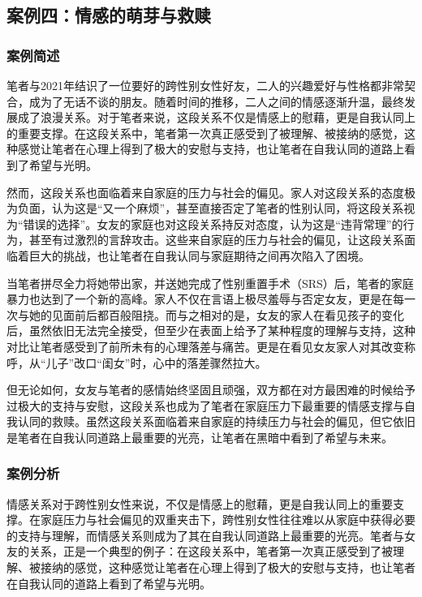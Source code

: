 \documentclass[twocolumn]{ctexart}
\begin{document}
\subsection {案例四：情感的萌芽与救赎}
\subsubsection{案例简述}
笔者与2021年结识了一位要好的跨性别女性好友，二人的兴趣爱好与性格都非常契合，成为了无话不谈的朋友。随着时间的推移，二人之间的情感逐渐升温，最终发展成了浪漫关系。对于笔者来说，这段关系不仅是情感上的慰藉，更是自我认同上的重要支撑。在这段关系中，笔者第一次真正感受到了被理解、被接纳的感觉，这种感觉让笔者在心理上得到了极大的安慰与支持，也让笔者在自我认同的道路上看到了希望与光明。

然而，这段关系也面临着来自家庭的压力与社会的偏见。家人对这段关系的态度极为负面，认为这是“又一个麻烦”，甚至直接否定了笔者的性别认同，将这段关系视为“错误的选择”。女友的家庭也对这段关系持反对态度，认为这是“违背常理”的行为，甚至有过激烈的言辞攻击。这些来自家庭的压力与社会的偏见，让这段关系面临着巨大的挑战，也让笔者在自我认同与家庭期待之间再次陷入了困境。

当笔者拼尽全力将她带出家，并送她完成了性别重置手术（SRS）后，笔者的家庭暴力也达到了一个新的高峰。家人不仅在言语上极尽羞辱与否定女友，更是在每一次与她的见面前后都百般阻挠。而与之相对的是，女友的家人在看见孩子的变化后，虽然依旧无法完全接受，但至少在表面上给予了某种程度的理解与支持，这种对比让笔者感受到了前所未有的心理落差与痛苦。更是在看见女友家人对其改变称呼，从“儿子”改口“闺女”时，心中的落差骤然拉大。

但无论如何，女友与笔者的感情始终坚固且顽强，双方都在对方最困难的时候给予过极大的支持与安慰，这段关系也成为了笔者在家庭压力下最重要的情感支撑与自我认同的救赎。虽然这段关系面临着来自家庭的持续压力与社会的偏见，但它依旧是笔者在自我认同道路上最重要的光亮，让笔者在黑暗中看到了希望与未来。

\subsubsection{案例分析}
情感关系对于跨性别女性来说，不仅是情感上的慰藉，更是自我认同上的重要支撑。在家庭压力与社会偏见的双重夹击下，跨性别女性往往难以从家庭中获得必要的支持与理解，而情感关系则成为了其在自我认同道路上最重要的光亮\cite{pan2023gendertrouble}。笔者与女友的关系，正是一个典型的例子：在这段关系中，笔者第一次真正感受到了被理解、被接纳的感觉，这种感觉让笔者在心理上得到了极大的安慰与支持，也让笔者在自我认同的道路上看到了希望与光明。
\end{document}
